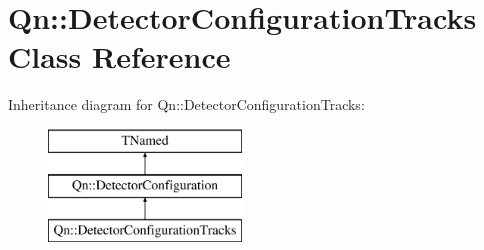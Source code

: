 \hypertarget{classQn_1_1DetectorConfigurationTracks}{}\section{Qn\+:\+:Detector\+Configuration\+Tracks Class Reference}
\label{classQn_1_1DetectorConfigurationTracks}
Inheritance diagram for Qn\+:\+:Detector\+Configuration\+Tracks\+:\begin{figure}[H]
\begin{center}
\leavevmode
\includegraphics[height=3.000000cm]{classQn_1_1DetectorConfigurationTracks}
\end{center}
\end{figure}
